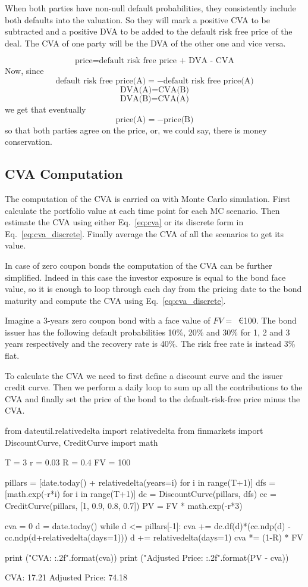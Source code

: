 When both parties have non-null default probabilities, they consistently include both defaults into the valuation. So they will mark a positive CVA to be subtracted and a positive DVA to be added to the default risk free price of the deal. The CVA of one party will be the DVA of the other one and vice versa.

\[
\textrm{price}=\textrm{default risk free price + DVA - CVA}
\]
Now, since
\[
\textrm{default risk free price(A)} = - \textrm{default risk free price(A)}
\]
\[
\textrm{DVA(A)} = \textrm{CVA(B)}
\]
\[
\textrm{DVA(B)} = \textrm{CVA(A)}
\]
we get that eventually
\[
\textrm{price(A)} = -\textrm{price(B)}
\]
so that both parties agree on the price, or, we could say, there is money conservation.

\subsection{CVA Computation}

The computation of the CVA is carried on with Monte Carlo simulation. 
First calculate the portfolio value at each time point for each MC scenario. Then estimate the CVA using either Eq.~\ref{eq:cva} or its discrete form in Eq.~\ref{eq:cva_discrete}. Finally average the CVA of all the scenarios to get its value.

In case of zero coupon bonds the computation of the CVA can be further simplified. Indeed in this case the investor exposure is equal to the bond face value, so it is enough to loop through each day from the pricing date to the bond maturity and compute the CVA using Eq.~\ref{eq:cva_discrete}.

Imagine a 3-years zero coupon bond with a face value of $FV=$~\euro{100}. The bond issuer has the following default probabilities 10\%, 20\% and 30\% for 1, 2 and 3 years respectively and the recovery rate is 40\%. The risk free rate is instead 3\% flat. 

To calculate the CVA we need to first define a discount curve and the issuer credit curve. Then we perform a daily loop to sum up all the contributions to the CVA and finally set the price of the bond to the default-risk-free price minus the CVA.

\begin{ipython}
from dateutil.relativedelta import relativedelta
from finmarkets import DiscountCurve, CreditCurve
import math

T = 3
r = 0.03
R = 0.4
FV = 100

pillars = [date.today() + relativedelta(years=i) for i in range(T+1)]
dfs = [math.exp(-r*i) for i in range(T+1)]
dc = DiscountCurve(pillars, dfs)
cc = CreditCurve(pillars, [1, 0.9, 0.8, 0.7])
PV = FV * math.exp(-r*3)

cva = 0
d = date.today()
while d <= pillars[-1]:
    cva += dc.df(d)*(cc.ndp(d) - cc.ndp(d+relativedelta(days=1)))
    d += relativedelta(days=1)
cva *= (1-R) * FV

print ("CVA: {:.2f}".format(cva))
print ("Adjusted Price: {:.2f}".format(PV - cva))
\end{ipython}
\begin{ioutput}
CVA: 17.21
Adjusted Price: 74.18
\end{ioutput}

